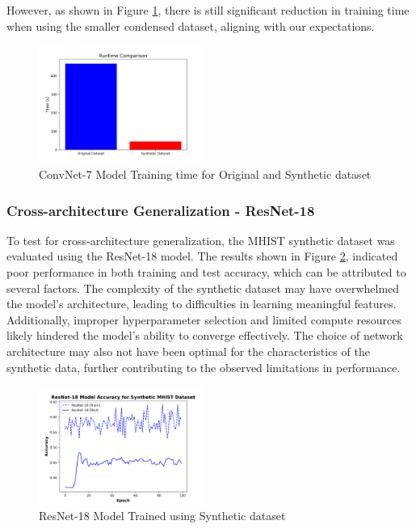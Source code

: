 \documentclass[conference, compsoc]{IEEEtran}
\begin{document}
	However, as shown in Figure \ref{fig:mhist_syn_time}, there is still significant reduction in training time when using the smaller condensed dataset, aligning with our expectations.
	
	\begin{figure}[H]
		\centering
		\includegraphics[width=0.48\textwidth]{mhist_syn_time.png}
		\caption{ConvNet-7 Model Training time for Original and Synthetic dataset}
		\label{fig:mhist_syn_time}
	\end{figure}
	\subsubsection{Cross-architecture Generalization - ResNet-18} \hfill
	
	To test for cross-architecture generalization, the MHIST synthetic dataset was evaluated using the ResNet-18 model. The results shown in Figure \ref{fig:mhist_resnet_acc}, indicated poor performance in both training and test accuracy, which can be attributed to several factors. The complexity of the synthetic dataset may have overwhelmed the model's architecture, leading to difficulties in learning meaningful features. Additionally, improper hyperparameter selection and limited compute resources likely hindered the model's ability to converge effectively. The choice of network architecture may also not have been optimal for the characteristics of the synthetic data, further contributing to the observed limitations in performance.

	\begin{figure}[H]
		\centering
		\includegraphics[width=0.48\textwidth]{mhist_resnet_acc.png}
		\caption{ResNet-18 Model Trained using Synthetic dataset}
		\label{fig:mhist_resnet_acc}
	\end{figure}
	
\end{document}
